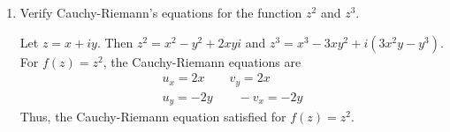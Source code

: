\begin{enumerate}
\begin{align*}
{      \text{term } 1} +
      \underbrace{\frac{\partial h}{\partial v}\frac{\partial v}{\partial x} -
      \frac{\partial t}{\partial v}\frac{\partial v}{\partial y}}_{\text{term }
      2}\eqnumtag\label{2.1.2.1crx}\\
    \intertext{In order for the right hand side of \cref{2.1.2.1crx} to be
    zero, we need both terms to be zero.}
    \frac{\partial h}{\partial u}\frac{\partial u}{\partial x} -
    \frac{\partial t}{\partial u}\frac{\partial u}{\partial y}
    & = \frac{\partial h}{\partial u}\frac{\partial u}{\partial x} -
      \frac{\partial t}{\partial y}\frac{\partial u}{\partial u}\\
    & = \frac{\partial h}{\partial u}\frac{\partial u}{\partial x} -
      \frac{\partial h}{\partial u}\frac{\partial u}{\partial x}\eqnumtag
      \label{2.1.2.1ux}\\
    \intertext{\Cref{2.1.2.1ux} occurs since \(g\) is analytic and satisfies
    the Cauchy-Riemann equations.}
    & = 0\\
    \intertext{For the second term in \cref{2.1.2.1crx}, we again use the
    analyticity of \(g\).}
    \frac{\partial h}{\partial v}\frac{\partial v}{\partial x} -
    \frac{\partial t}{\partial v}\frac{\partial v}{\partial y}
    & = \frac{\partial h}{\partial v}\frac{\partial v}{\partial x} -
      \frac{\partial h}{\partial v}\frac{\partial v}{\partial x}\\
    & = 0\\
    \intertext{Therefore, from \cref{2.1.2.1crx}, we have}
    \frac{\partial h}{\partial x} - \frac{\partial t}{\partial y} & = 0\\
    \frac{\partial h}{\partial x} & = \frac{\partial t}{\partial y}
  \end{align*}
  By similar analysis, we are able to conclude that
  \(\frac{\partial h}{\partial y} = -\frac{\partial t}{\partial x}\).
  Therefore, \(g(f(z))\) satisfies the Cauchy-Riemann so it is analytic.
\item
  Verify Cauchy-Riemann's equations for the function \(z^2\) and \(z^3\).
  \par\smallskip
  Let \(z = x + iy\).
  Then \(z^2 = x^2 - y^2 + 2xyi\) and
  \(z^3 = x^3 - 3xy^2 + i(3x^2y - y^3)\).
  For \(f(z) = z^2\), the Cauchy-Riemann equations are
  \begin{gather*}
    u_x = 2x \qquad v_y = 2x\\
    u_y = -2y \qquad -v_x = -2y
  \end{gather*}
  Thus, the Cauchy-Riemann equation satisfied for \(f(z) = z^2\).

\end{enumerate}
